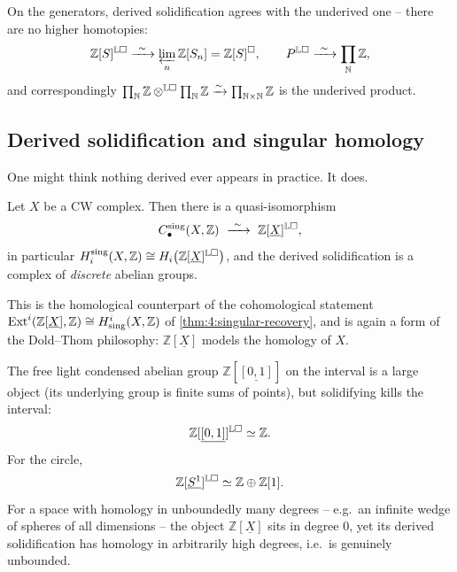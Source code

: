 On the generators, derived solidification agrees with the underived one -- there
are no higher homotopies:
\begin{equation*}
\mathbb{Z}[S]^{\mathbb{L}\solid}\xrightarrow{\ \sim\ }\varprojlim_{n}\mathbb{Z}[S_{n}]
=\mathbb{Z}[S]^{\solid},\qquad
P^{\mathbb{L}\solid}\xrightarrow{\ \sim\ }\prod_{\mathbb{N}}\mathbb{Z},
\end{equation*}
and correspondingly
$\prod_{\mathbb{N}}\mathbb{Z}\otimes^{\mathbb{L}\square}\prod_{\mathbb{N}}\mathbb{Z}
\xrightarrow{\sim}\prod_{\mathbb{N}\times\mathbb{N}}\mathbb{Z}$ is the underived
product.

\subsection{Derived solidification and singular homology}

One might think nothing derived ever appears in practice. It does.

\begin{proposition}
\label{prop:6:singular-homology}
Let $X$ be a CW complex. Then there is a quasi-isomorphism
\begin{equation*}
C^{\mathrm{sing}}_{\bullet}(X,\mathbb{Z})\ \xrightarrow{\ \sim\ }\ \mathbb{Z}[\underline{X}]^{\mathbb{L}\solid},
\end{equation*}
in particular
$H_{i}^{\mathrm{sing}}(X,\mathbb{Z})\cong H_{i}\bigl(\mathbb{Z}[\underline{X}]^{\mathbb{L}\square}\bigr)$,
and the derived solidification is a complex of \emph{discrete} abelian groups.
\end{proposition}

This is the homological counterpart of the cohomological statement
$\operatorname{Ext}^{i}(\mathbb{Z}[\underline{X}],\mathbb{Z})\cong H^{i}_{\mathrm{sing}}(X,\mathbb{Z})$
of \cref{thm:4:singular-recovery}, and is again a form of the Dold--Thom
philosophy: $\mathbb{Z}[\underline{X}]$ models the homology of $X$.

\begin{example}
\label{ex:6:solid-of-spaces}
The free light condensed abelian group $\mathbb{Z}[\underline{[0,1]}]$ on the
interval is a large object (its underlying group is finite sums of points), but
solidifying kills the interval:
\begin{equation*}
\mathbb{Z}[\underline{[0,1]}]^{\mathbb{L}\square}\simeq\mathbb{Z}.
\end{equation*}
For the circle,
\begin{equation*}
\mathbb{Z}[\underline{S^{1}}]^{\mathbb{L}\square}\simeq\mathbb{Z}\oplus\mathbb{Z}[1].
\end{equation*}
For a space with homology in unboundedly many degrees -- e.g.\ an infinite
wedge of spheres of all dimensions -- the object $\mathbb{Z}[\underline{X}]$ sits
in degree $0$, yet its derived solidification has homology in arbitrarily high
degrees, i.e.\ is genuinely unbounded.
\end{example}

